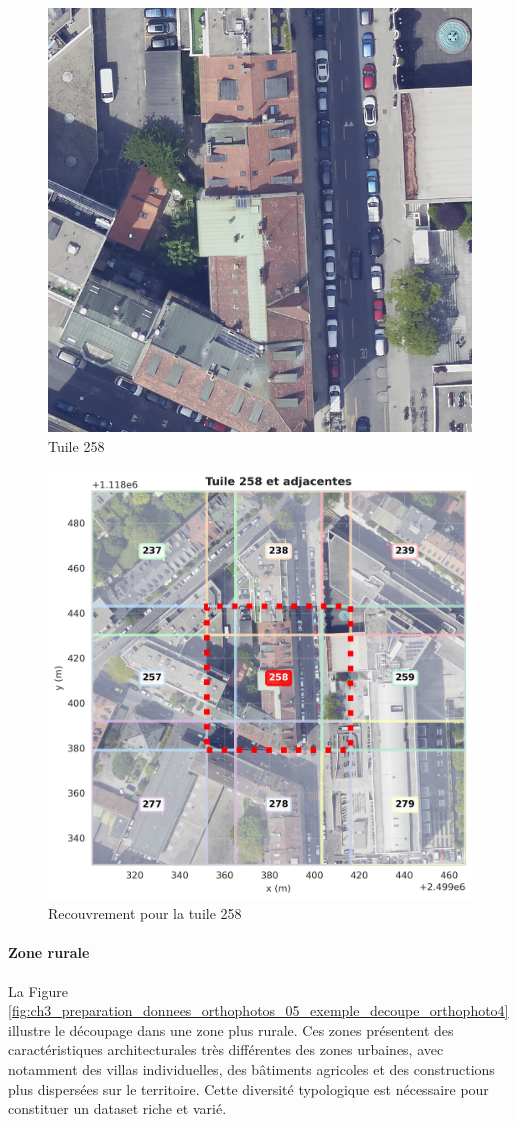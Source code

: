 \begin{figure}[H]
    \centering
    \includegraphics[width=0.40\linewidth]{02-main/figures/ch3/ch3_preparation_donnees_orthophotos_04a_exemple_decoupe_orthophoto3.png}
    \caption{Tuile 258}
    \label{fig:ch3_preparation_donnees_orthophotos_04a_exemple_decoupe_orthophoto3}
\end{figure}
\begin{figure}[H]
    \centering
    \includegraphics[width=0.90\linewidth]{02-main/figures/ch3/ch3_preparation_donnees_orthophotos_04_exemple_decoupe_orthophoto3.png}
    \caption{Recouvrement pour la tuile 258}
    \label{fig:ch3_preparation_donnees_orthophotos_04_exemple_decoupe_orthophoto3}
\end{figure}


\newpage
\paragraph{Zone rurale}
La Figure \ref{fig:ch3_preparation_donnees_orthophotos_05_exemple_decoupe_orthophoto4} illustre le découpage dans une zone plus rurale. Ces zones présentent des caractéristiques architecturales très différentes des zones urbaines, avec notamment des villas individuelles, des bâtiments agricoles et des constructions plus dispersées sur le territoire. Cette diversité typologique est nécessaire pour constituer un dataset riche et varié.

